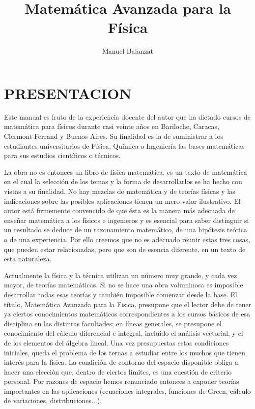\documentclass[10pt]{article}
\title{Matemática Avanzada para la Física\vspace{1.5cm}}
\author{Manuel Balanzat}
\date{}
\theoremstyle{plain}
\theoremstyle{definition}
\theoremstyle{remark}
\begin{document}
\maketitle

\section*{PRESENTACION}
Este manual es fruto de la experiencia docente del autor que ha dictado cursos de matemática para físicos durante casi veinte años en Bariloche, Caracas, Clermont-Ferrand y Buenos Aires. Su finalidad es la de suministrar a los estudiantes universitarios de Física, Química o Ingeniería las bases matemáticas para sus estudios científicos o técnicos.

La obra no es entonces un libro de física matemática, es un texto de matemática en el cual la selección de los temas y la forma de desarrollarlos se ha hecho con vistas a su finalidad. No hay mezclas de matemática y de teorías físicas y las indicaciones sobre las posibles aplicaciones tienen un mero valor ilustrativo. El autor está firmemente convencido de que ésta es la manera más adecuada de enseñar matemática a los físicos e ingenieros y es esencial para saber distinguir si un resultado se deduce de un razonamiento matemático, de una hipótesis teórica o de una experiencia. Por ello creemos que no es adecuado reunir estas tres cosas, que pueden estar relacionadas, pero que son de esencia diferente, en un texto de esta naturaleza.

Actualmente la física y la técnica utilizan un número muy grande, y cada vez mayor, de teorías matemáticas. Si no se hace una obra voluminosa es imposible desarrollar todas esas teorías y también imposible comenzar desde la base. El título, Matemática Avanzada para la Fisica, presupone que el lector debe de tener ya ciertos conocimientos matemáticos correspondientes a los cursos básicos de esa disciplina en las distintas facultades; en líneas generales, se presupone el conocimiento del cálculo diferencial e integral, incluido el análisis vectorial, y el de los elementos del álgebra lineal. Una vez presupuestas estas condiciones iniciales, queda el problema de los ternas a estudiar entre los muchos que tienen interés para la física. La condición de contorno del espacio disponible obliga a hacer una elección que, dentro de ciertos límites, es una cuestión de criterio personal. Por razones de espacio hemos renunciado entonces a exponer teorías importantes en las aplicaciones (ecuaciones integrales, funciones de Green, cálculo de variaciones, distribuciones...).
\end{document}
